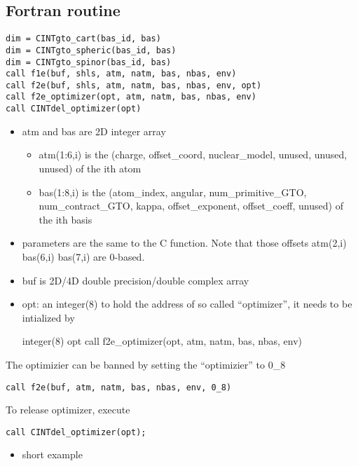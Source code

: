 \documentclass[]{article}
\begin{document}
\subsection{Fortran routine}\label{fortran-routine}

\begin{verbatim}
dim = CINTgto_cart(bas_id, bas)
dim = CINTgto_spheric(bas_id, bas)
dim = CINTgto_spinor(bas_id, bas)
call f1e(buf, shls, atm, natm, bas, nbas, env)
call f2e(buf, shls, atm, natm, bas, nbas, env, opt)
call f2e_optimizer(opt, atm, natm, bas, nbas, env)
call CINTdel_optimizer(opt)
\end{verbatim}

\begin{itemize}
\item
  atm and bas are 2D integer array

  \begin{itemize}
  \itemsep1pt\parskip0pt
  \item
    atm(1:6,i) is the (charge, offset\_coord, nuclear\_model, unused,
    unused, unused) of the ith atom
  \item
    bas(1:8,i) is the (atom\_index, angular, num\_primitive\_GTO,
    num\_contract\_GTO, kappa, offset\_exponent, offset\_coeff, unused)
    of the ith basis
  \end{itemize}
\item
  parameters are the same to the C function. Note that those offsets
  atm(2,i) bas(6,i) bas(7,i) are 0-based.
\item
  buf is 2D/4D double precision/double complex array
\item
  opt: an integer(8) to hold the address of so called ``optimizer'', it
  needs to be intialized by

  integer(8) opt call f2e\_optimizer(opt, atm, natm, bas, nbas, env)
\end{itemize}

The optimizier can be banned by setting the ``optimizier'' to 0\_8

\begin{verbatim}
call f2e(buf, atm, natm, bas, nbas, env, 0_8)
\end{verbatim}

To release optimizer, execute

\begin{verbatim}
call CINTdel_optimizer(opt);
\end{verbatim}

\begin{itemize}
\itemsep1pt\parskip0pt
\item
  short example
\end{itemize}
\end{document}
